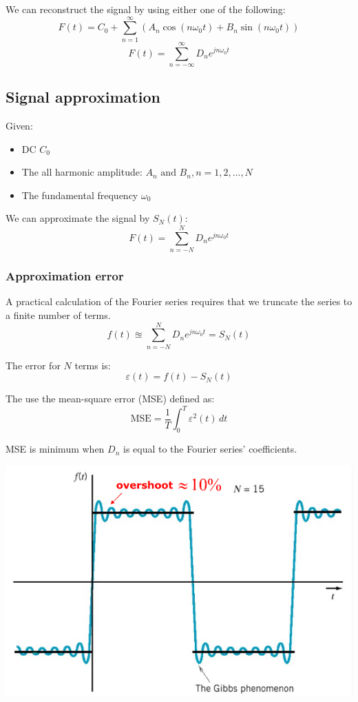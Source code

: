\documentclass[11pt]{article}
\begin{document}
We can reconstruct the signal by using either one of the following:
\[F(t) = C_0 + \sum_{n = 1}^{\infty} (A_n \cos (n \omega_0 t) + B_n \sin (n \omega_0 t))\]
\[F(t) = \sum_{n = - \infty}^{\infty} D_n e^{jn \omega_0 t}\]
\subsection{Signal approximation}
\label{sec:orgc988080}
Given:
\begin{itemize}
\item DC \(C_0\)
\item The all harmonic amplitude: \(A_n \text{ and } B_n, n = 1, 2, \ldots, N\)
\item The fundamental frequency \(\omega_0\)
\end{itemize}

We can approximate the signal by \(S_N (t)\):
\[F(t) = \sum_{n = - N}^{N} D_n e^{jn \omega_0 t}\]

 \newpage
\subsubsection{Approximation error}
\label{sec:org20ccec6}
A practical calculation of the Fourier series requires that we truncate the series to a finite number of terms.
\[f(t) \approxeq \sum_{n = - N}^{N} D_n e^{jn \omega_0 t} = S_N (t)\]

The error for \(N\) terms is:
\[\varepsilon (t) = f(t) - S_N (t)\]

The use the mean-square error (MSE) defined as:
\[\text{MSE} = \frac{1}{T} \int_0^T \varepsilon^2 (t) \, dt\]

MSE is minimum when \(D_n\) is equal to the Fourier series' coefficients.
\begin{center}
\includegraphics[width=.9\linewidth]{./images/approximation-error-graph.png}
\end{center}
\end{document}
